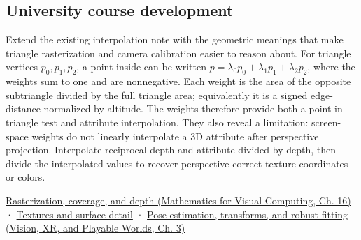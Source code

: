 \subsection{University course development}\label{appendix-02b9d9a81dca-university-course-development}

Extend the existing interpolation note with the geometric meanings that make triangle rasterization and camera calibration easier to reason about. For triangle vertices \(p_0,p_1,p_2\), a point inside can be written \(p=\lambda_0p_0+\lambda_1p_1+\lambda_2p_2\), where the weights sum to one and are nonnegative. Each weight is the area of the opposite subtriangle divided by the full triangle area; equivalently it is a signed edge-distance normalized by altitude. The weights therefore provide both a point-in-triangle test and attribute interpolation. They also reveal a limitation: screen-space weights do not linearly interpolate a 3D attribute after perspective projection. Interpolate reciprocal depth and attribute divided by depth, then divide the interpolated values to recover perspective-correct texture coordinates or colors.

\href{../02-Mathematics-for-Visual-Computing/main.pdf\#nameddest=03-visual-computing-i-ch012-rasterization-coverage-and-depth}{Rasterization, coverage, and depth (Mathematics for Visual Computing, Ch. 16)} · \hyperref[03-visual-computing-i-ch019-textures-and-surface-detail]{Textures and surface detail} · \href{../07-Vision-XR-and-Playable-Worlds/main.pdf\#nameddest=04-visual-computing-ii-ch032-pose-estimation-transforms-and-robust-fitting}{Pose estimation, transforms, and robust fitting (Vision, XR, and Playable Worlds, Ch. 3)}

